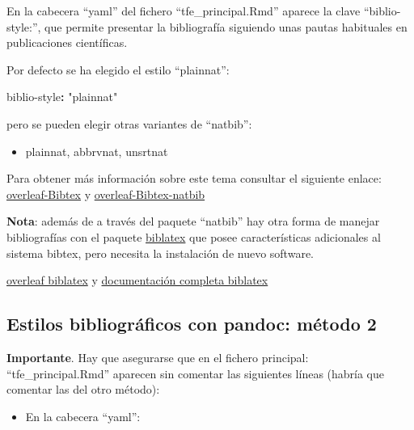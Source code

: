 \documentclass[12pt,a4paper,]{book}
\newenvironment{Shaded}{\begin{snugshade}}{\end{snugshade}}
\newcommand{\AttributeTok}[1]{\textcolor[rgb]{0.77,0.63,0.00}{#1}}
\newcommand{\FunctionTok}[1]{\textcolor[rgb]{0.00,0.00,0.00}{#1}}
\newcommand{\KeywordTok}[1]{\textcolor[rgb]{0.13,0.29,0.53}{\textbf{#1}}}
\newcommand{\StringTok}[1]{\textcolor[rgb]{0.31,0.60,0.02}{#1}}
\providecommand{\tightlist}{%
  \setlength{\itemsep}{0pt}\setlength{\parskip}{0pt}}
\numberwithin{dummy}{section}
\theoremstyle{ocrenumbox}
\theoremstyle{blacknumex}
\theoremstyle{blacknumbox}
\theoremstyle{ocrenum}
\theoremstyle{ocrenum}
\begin{document}
En la cabecera ``yaml'' del fichero ``tfe\_principal.Rmd'' aparece la
clave ``biblio-style:'', que permite presentar la bibliografía siguiendo
unas pautas habituales en publicaciones científicas.

Por defecto se ha elegido el estilo ``plainnat'':

\begin{Shaded}
\begin{Highlighting}[]
\FunctionTok{biblio{-}style}\KeywordTok{:}\AttributeTok{ }\StringTok{"plainnat"}\AttributeTok{ }
\end{Highlighting}
\end{Shaded}

pero se pueden elegir otras variantes de ``natbib'':

\begin{itemize}
\tightlist
\item
  plainnat, abbrvnat, unsrtnat
\end{itemize}

Para obtener más información sobre este tema consultar el siguiente
enlace:
\href{https://www.overleaf.com/learn/latex/Bibtex_bibliography_styles}{overleaf-Bibtex}
y
\href{https://www.overleaf.com/learn/latex/Bibliography_management_with_natbib}{overleaf-Bibtex-natbib}

\textbf{Nota}: además de a través del paquete ``natbib'' hay otra forma
de manejar bibliografías con el paquete
\href{https://www.overleaf.com/learn/latex/Bibliography_management_with_biblatex}{biblatex}
que posee características adicionales al sistema bibtex, pero necesita
la instalación de nuevo software.

\href{https://www.overleaf.com/learn/latex/Articles/Getting_started_with_BibLaTeX}{overleaf
biblatex} y
\href{http://mirror.ox.ac.uk/sites/ctan.org/macros/latex/contrib/biblatex/doc/biblatex.pdf}{documentación
completa biblatex}

\hypertarget{bibliografiametodo2}{%
\subsection{Estilos bibliográficos con pandoc: método
2}\label{bibliografiametodo2}}

\textbf{Importante}. Hay que asegurarse que en el fichero principal:
``tfe\_principal.Rmd'' aparecen sin comentar las siguientes líneas
(habría que comentar las del otro método):

\begin{itemize}
\tightlist
\item
  En la cabecera ``yaml'':
\end{itemize}
\end{document}
